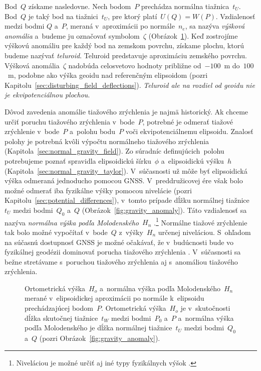 \documentclass[a4paper,12pt]{book}
\begin{document}
Bod~$Q$ získame nasledovne.  Nech bodom~$P$ prechádza normálna tiažnica~$t_U$.  
Bod~$Q$ je taký bod na tiažnici~$t_U$, pre ktorý platí~$U(Q) = W(P)$.  
Vzdialenosť medzi bodmi $Q$ a~$P$, meraná v~aproximácii po normále~$n_e$, sa 
nazýva \emph{výšková anomália} a~budeme ju označovať symbolom~$\zeta$ 
(Obrázok~\ref{fig:heights}).  Keď zostrojíme výškovú anomáliu pre každý bod na 
zemskom povrchu, získame plochu, ktorú budeme nazývať \emph{teluroid}.  
Teluroid predstavuje aproximáciu zemského povrchu.  Výšková anomália~$\zeta$ 
nadobúda celosvetovo hodnoty približne od~$-100$~m do~$100$~m, podobne ako 
výška geoidu nad referenčným elipsoidom (pozri 
Kapitolu~\ref{sec:disturbing_field_deflections}).  \emph{Teluroid ale na 
rozdiel od geoidu nie je ekvipotenciálnou plochou}.

Dôvod zavedenia anomálie tiažového zrýchlenia je najmä historický.  Ak chceme 
určiť poruchu tiažového zrýchlenia v~bode~$P$, potrebné je odmerať tiažové 
zrýchlenie v~bode~$P$ a~polohu bodu~$P$ voči ekvipotenciálnemu elipsoidu.  
Znalosť polohy je potrebná kvôli výpočtu normálneho tiažového zrýchlenia 
(Kapitola~\ref{sec:normal_gravity_field}).  Zo súradníc definujúcich~polohu 
potrebujeme poznať spravidla elipsoidickú šírku~$\phi$ a~elipsoidickú výšku~$h$ 
(Kapitola~\ref{sec:normal_gravity_taylor}).  V~súčasnosti už môže byť 
elipsoidická výška odmeraná jednoducho pomocou GNSS.  V~preddružicovej ére však 
bolo možné odmerať iba fyzikálne výšky pomocou nivelácie (pozri 
Kapitolu~\ref{sec:potential_differences}), v~tomto prípade dĺžku normálnej 
tiažnice~$t_U$ medzi bodmi~$Q_0$ a~$Q$ (Obrázok~\ref{fig:gravity_anomaly}).  
Táto vzdialenosť sa nazýva \emph{normálna výška podľa Molodenského}~$H_n$ 
\parencite{MoritzPhysicalGeodesy}.\footnote{Niveláciou je možné určiť aj iné 
typy fyzikálnych výšok \parencite[pozri napríklad][]{MoritzPhysicalGeodesy}.}  
Normálne tiažové zrýchlenie tak bolo možné vypočítať v~bode~$Q$ z~výšky~$H_n$ 
určenej niveláciou.  S~ohľadom na súčasnú dostupnosť GNSS je možné očakávať, že 
v~budúcnosti bude vo fyzikálnej geodézii dominovať porucha tiažového zrýchlenia 
\parencite{MoritzPhysicalGeodesy}.  V~súčasnosti sa bežne stretávame s~poruchou 
tiažového zrýchlenia aj s~anomáliou tiažového zrýchlenia.

\begin{figure}[bt]
\centering

\caption{Ortometrická výška~$H_o$ a~normálna výška podľa Molodenského~$H_n$ 
merané v~elipsoidickej aproximácii po normále k~elipsoidu prechádzajúcej 
bodom~$P$.  Ortometrická výška~$H_o$ je v~skutočnosti dĺžka skutočnej 
tiažnice~$t_W$ medzi bodmi~$P_0$ a~$P$ a~normálna výška podľa Molodenského je 
dĺžka normálnej tiažnice~$t_U$ medzi bodmi~$Q_0$ a~$Q$ (pozri 
Obrázok~\ref{fig:gravity_anomaly}).}
\label{fig:heights}
\end{figure}
\end{document}
